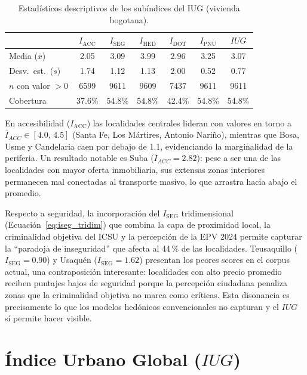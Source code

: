 \documentclass[12pt, a4paper, twoside, openright]{report}
\theoremstyle{plain}
\theoremstyle{definition}
\newcommand{\IHED}{I_{\text{HED}}} %
\newcommand{\IACC}{I_{\text{ACC}}} %
\newcommand{\ISEG}{I_{\text{SEG}}} %
\newcommand{\IDOT}{I_{\text{DOT}}} %
\newcommand{\IPNU}{I_{\text{PNU}}} %
\newcommand{\IUG}{IUG}             %
\begin{document}
\begin{table}[htbp]
\centering
\caption{Estadísticos descriptivos de los subíndices del IUG (vivienda bogotana).}
\label{tab:estadisticos_ind_res}
\begin{tabular}{@{}lcccccc@{}}
\toprule
& $\IACC$ & $\ISEG$ & $\IHED$ & $\IDOT$ & $\IPNU$ & $\IUG$ \\
\midrule
Media ($\bar{x}$) & 2.05 & 3.09 & 3.99 & 2.96 & 3.25 & 3.07 \\
Desv.\ est.\ ($s$)  & 1.74 & 1.12 & 1.13 & 2.00 & 0.52 & 0.77 \\
$n$ con valor $> 0$ & \num{6599} & \num{9611} & \num{9609} & \num{7437} & \num{9611} & \num{9611} \\
Cobertura & 37.6\% & 54.8\% & 54.8\% & 42.4\% & 54.8\% & 54.8\% \\
\bottomrule
\end{tabular}
\end{table}

En accesibilidad ($\IACC$) las localidades centrales lideran con valores en torno a $\bar{I}_{ACC} \in [4.0,\,4.5]$ (Santa Fe, Los Mártires, Antonio Nariño), mientras que Bosa, Usme y Candelaria caen por debajo de 1.1, evidenciando la marginalidad de la periferia. Un resultado notable es Suba ($\bar{I}_{ACC} = 2.82$): pese a ser una de las localidades con mayor oferta inmobiliaria, sus extensas zonas interiores permanecen mal conectadas al transporte masivo, lo que arrastra hacia abajo el promedio.

Respecto a seguridad, la incorporación del $\ISEG$ tridimensional (Ecuación~\ref{eq:iseg_tridim}) que combina la capa de proximidad local, la criminalidad objetiva del ICSU y la percepción de la EPV 2024 permite capturar la ``paradoja de inseguridad'' que afecta al 44\,\% de las localidades. Teusaquillo ($\ISEG = 0.90$) y Usaquén ($\ISEG = 1.62$) presentan los peores scores en el corpus actual, una contraposición interesante: localidades con alto precio promedio reciben puntajes bajos de seguridad porque la percepción ciudadana penaliza zonas que la criminalidad objetiva no marca como críticas. Esta disonancia es precisamente lo que los modelos hedónicos convencionales no capturan y el $\IUG{}$ sí permite hacer visible.


\section{Índice Urbano Global ($\IUG$)}\label{sec:iug_resultados}
\end{document}
